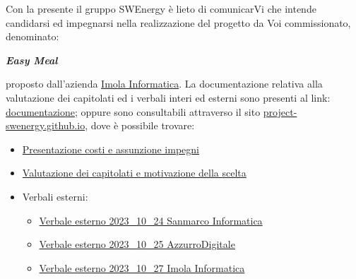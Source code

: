 Con la presente il gruppo SWEnergy è lieto di comunicarVi che intende candidarsi
ed impegnarsi nella realizzazione del progetto da Voi commissionato, denominato:

\begin{center}
\textbf{\textit{Easy Meal}}
\end{center}

\noindent
proposto dall'azienda \href{https://imolainformatica.it/}{Imola Informatica}. 
La documentazione relativa alla valutazione dei capitolati ed i verbali
interi ed esterni sono presenti al link:
\href{https://github.com/Project-SWEnergy/documentazione}{documentazione};
oppure sono consultabili attraverso il sito 
\href{https://project-swenergy.github.io/}{project-swenergy.github.io},
dove è possibile trovare:

\begin{itemize}
	\item
		\href{https://github.com/Project-SWEnergy/documentazione/blob/main/Candidatura/Presentazione%20costi%20e%20assunzione%20impegni.pdf}{Presentazione costi e assunzione impegni}

	\item
		\href{https://github.com/Project-SWEnergy/documentazione/blob/main/Candidatura/Valutazione%20capitolati.pdf}{Valutazione dei capitolati e motivazione della scelta}
	
	\item Verbali esterni:
		\begin{itemize}
			\item
				\href{https://github.com/Project-SWEnergy/documentazione/blob/main/Candidatura/Verbali/Esterni/Verbale%20esterno%20-%202023_10_24%20Sanmarco.pdf}{Verbale esterno 2023\_10\_24 Sanmarco Informatica}
			\item
				\href{https://github.com/Project-SWEnergy/documentazione/blob/main/Candidatura/Verbali/Esterni/Verbale%20esterno%20-%202023_10_25%20AzzurroDigitale.pdf}{Verbale esterno 2023\_10\_25 AzzurroDigitale}
			\item
				\href{https://github.com/Project-SWEnergy/documentazione/blob/main/Candidatura/Verbali/Esterni/Verbale%20esterno%20-%202023_10_27%20Imola%20Informatica.pdf}{Verbale esterno 2023\_10\_27 Imola Informatica}
		\end{itemize}


\end{itemize}
